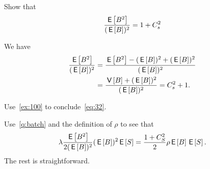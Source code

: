 \begin{extra}\label{q:batch}
Show that 
\begin{equation*}
\frac{\E{B^2}}{(\E{B})^2} = 1+C_s^2
\end{equation*}
\begin{solution}
We have
\begin{align*}
\frac{\E{B^2}}{(\E{B})^2}
  &=\frac{\E{B^2}-(\E B)^2 + (\E B)^2}{(\E{B})^2} \\
&= \frac{\V B + (\E B)^2}{(\E B)^2}= C_s^2+1.
\end{align*}
\end{solution}
\end{extra}


\begin{exercise}
Use~\cref{ex:100} to conclude~\cref{eq:32}.
\begin{solution}
Use~\cref{q:batch} and the definition of $\rho$ to see that
\begin{equation*}
 \lambda \frac{\E{B^2}}{2(\E B)^2} (\E B)^2 \E S = \frac{1 + C_S^2}2 \rho \E B \E S.
\end{equation*}
The rest is straightforward.
\end{solution}
\end{exercise}

